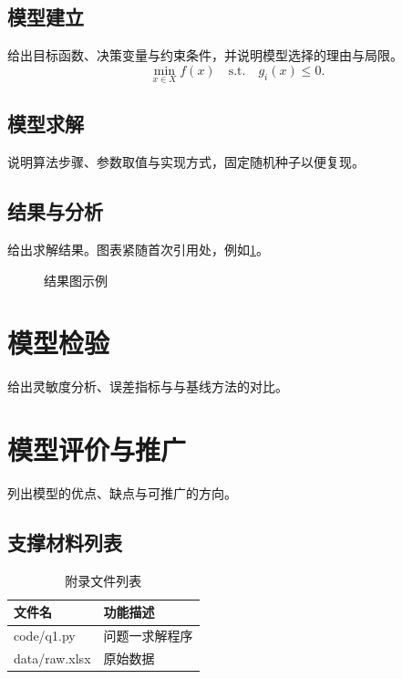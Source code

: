 \documentclass[withoutpreface,notoc]{cumcmthesis}
\begin{document}
\subsection{模型建立}
给出目标函数、决策变量与约束条件，并说明模型选择的理由与局限。
\begin{equation}
  \label{eq:objective}
  \min_{x \in X} f(x) \quad \text{s.t.} \quad g_i(x) \le 0 .
\end{equation}

\subsection{模型求解}
说明算法步骤、参数取值与实现方式，固定随机种子以便复现。

\subsection{结果与分析}
给出求解结果。图表紧随首次引用处，例如\cref{fig:result}。
\begin{figure}[htbp]
  \centering
  \caption{结果图示例}
  \label{fig:result}
\end{figure}

\section{模型检验}
给出灵敏度分析、误差指标与与基线方法的对比。

\section{模型评价与推广}
列出模型的优点、缺点与可推广的方向。




\newpage
\begin{appendices}
  \section{支撑材料列表}
  \begin{table}[H]
    \centering
    \caption{附录文件列表}
    \label{tab:files}
    \begin{tabularx}{\textwidth}{LL}
      \toprule
      文件名 & 功能描述 \\
      \midrule
      code/q1.py & 问题一求解程序 \\
      data/raw.xlsx & 原始数据 \\
      \bottomrule
    \end{tabularx}
  \end{table}
\end{appendices}
\end{document}
